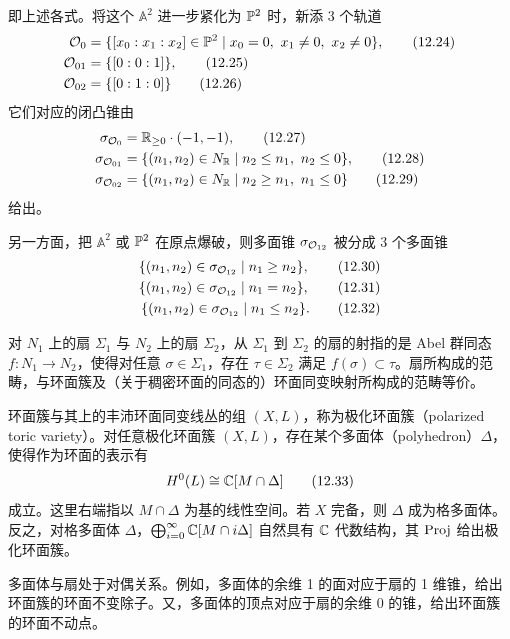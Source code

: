 
即上述各式。将这个 $\mathbb{A}^2$ 进一步紧化为 $\mathbb{P}^2$ 时，新添 3 个轨道
\begin{align}
    \cO_0 &= \{[x_0:x_1:x_2]\in\PP^2 \mid x_0=0,\ x_1\neq 0,\ x_2\neq 0\}, \tag{12.24}\\
    \cO_{01} &= \{[0:0:1]\}, \tag{12.25}\\
    \cO_{02} &= \{[0:1:0]\} \tag{12.26}
\end{align}
它们对应的闭凸锥由
\begin{align}
    \sigma_{\cO_0} &= \R_{\geq 0}\cdot(-1,-1), \tag{12.27}\\
    \sigma_{\cO_{01}} &= \{(n_1,n_2)\in N_\R \mid n_2\leq n_1,\ n_2\leq 0\}, \tag{12.28}\\
    \sigma_{\cO_{02}} &= \{(n_1,n_2)\in N_\R \mid n_2\geq n_1,\ n_1\leq 0\} \tag{12.29}
\end{align}
给出。

另一方面，把 $\mathbb{A}^2$ 或 $\mathbb{P}^2$ 在原点爆破，则多面锥 $\sigma_{\mathcal{O}_{12}}$ 被分成 3 个多面锥
\begin{align}
    \{(n_1,n_2)\in\sigma_{\mathcal{O}_{12}} \mid n_1\geq n_2\}, \tag{12.30}\\
    \{(n_1,n_2)\in\sigma_{\mathcal{O}_{12}} \mid n_1=n_2\}, \tag{12.31}\\
    \{(n_1,n_2)\in\sigma_{\mathcal{O}_{12}} \mid n_1\leq n_2\}. \tag{12.32}
\end{align}

对 $N_1$ 上的扇 $\Sigma_1$ 与 $N_2$ 上的扇 $\Sigma_2$，从 $\Sigma_1$ 到 $\Sigma_2$ 的扇的射指的是 Abel 群同态 $f\colon N_1\to N_2$，使得对任意 $\sigma\in\Sigma_1$，存在 $\tau\in\Sigma_2$ 满足 $f(\sigma)\subset\tau$。扇所构成的范畴，与环面簇及（关于稠密环面的同态的）环面同变映射所构成的范畴等价。

环面簇与其上的丰沛环面同变线丛的组 $(X,L)$，称为极化环面簇（polarized toric variety）。对任意极化环面簇 $(X,L)$，存在某个多面体（polyhedron）$\Delta$，使得作为环面的表示有
\begin{equation}
    H^0(L)\cong \mathbb{C}[M\cap\Delta] \tag{12.33}
\end{equation}
成立。这里右端指以 $M\cap\Delta$ 为基的线性空间。若 $X$ 完备，则 $\Delta$ 成为格多面体。反之，对格多面体 $\Delta$，$\bigoplus_{i=0}^{\infty}\mathbb{C}[M\cap i\Delta]$ 自然具有 $\mathbb{C}$ 代数结构，其 $\operatorname{Proj}$ 给出极化环面簇。

多面体与扇处于对偶关系。例如，多面体的余维 1 的面对应于扇的 1 维锥，给出环面簇的环面不变除子。又，多面体的顶点对应于扇的余维 0 的锥，给出环面簇的环面不动点。

